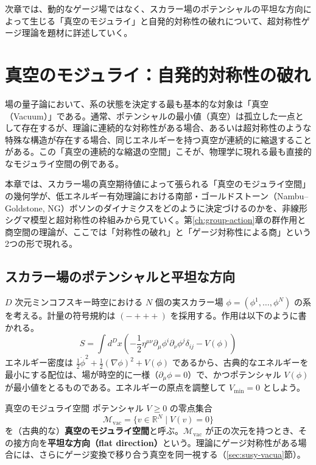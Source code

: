 \documentclass[uplatex, dvipdfmx, book]{jsbook}
\let\origsection\section
\let\origsubsection\subsection
\let\origsubsubsection\subsubsection
\newcommand{\chapter}{\origsection}
\renewcommand{\section}{\origsubsection}
\renewcommand{\subsection}{\origsubsubsection}
\renewcommand{\subsubsection}{\paragraph}
\begin{document}
次章では、動的なゲージ場ではなく、スカラー場のポテンシャルの平坦な方向によって生じる「真空のモジュライ」と自発的対称性の破れについて、超対称性ゲージ理論を題材に詳述していく。
\chapter{真空のモジュライ：自発的対称性の破れ}
\label{ch:vacuum}

場の量子論において、系の状態を決定する最も基本的な対象は「真空（Vacuum）」である。通常、ポテンシャルの最小値（真空）は孤立した一点として存在するが、理論に連続的な対称性がある場合、あるいは超対称性のような特殊な構造が存在する場合、同じエネルギーを持つ真空が連続的に縮退することがある。この「真空の連続的な縮退の空間」こそが、物理学に現れる最も直接的なモジュライ空間の例である。

本章では、スカラー場の真空期待値によって張られる「真空のモジュライ空間」の幾何学が、低エネルギー有効理論における南部・ゴールドストーン（Nambu--Goldstone, NG）ボソンのダイナミクスをどのように決定づけるのかを、非線形シグマ模型と超対称性の枠組みから見ていく。第\ref{ch:group-action}章の群作用と商空間の理論が、ここでは「対称性の破れ」と「ゲージ対称性による商」という2つの形で現れる。

\section{スカラー場のポテンシャルと平坦な方向}

$D$ 次元ミンコフスキー時空における $N$ 個の実スカラー場 $\phi = (\phi^1, \dots, \phi^N)$ の系を考える。計量の符号規約は $(-+++)$ を採用する。作用は以下のように書かれる。
\begin{equation}
    S = \int d^D x \left( -\frac{1}{2} \eta^{\mu\nu} \partial_\mu \phi^i \partial_\nu \phi^j \delta_{ij} - V(\phi) \right)
\end{equation}
エネルギー密度は $\frac{1}{2}\dot\phi^2 + \frac{1}{2}(\nabla\phi)^2 + V(\phi)$ であるから、古典的なエネルギーを最小にする配位は、場が時空的に一様（$\partial_\mu \phi = 0$）で、かつポテンシャル $V(\phi)$ が最小値をとるものである。エネルギーの原点を調整して $V_{\min} = 0$ としよう。

\begin{mydef}{真空のモジュライ空間}{}
ポテンシャル $V \ge 0$ の零点集合
\begin{equation*}
    \mathcal{M}_{\text{vac}} = \{ v \in \mathbb{R}^N \mid V(v) = 0 \}
\end{equation*}
を（古典的な）\textbf{真空のモジュライ空間}と呼ぶ。$\mathcal{M}_{\text{vac}}$ が正の次元を持つとき、その接方向を\textbf{平坦な方向（flat direction）}という。理論にゲージ対称性がある場合には、さらにゲージ変換で移り合う真空を同一視する（\ref{sec:susy-vacua}節）。
\end{mydef}
\end{document}
